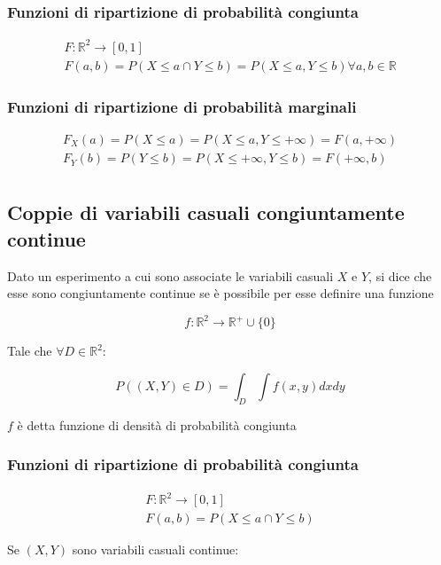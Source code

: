 \documentclass{article}
\begin{document}
\subsubsection{Funzioni di ripartizione di probabilità congiunta}

$$
\begin{matrix}
F:\mathbb{R}^2 \to [0,1] \\
F(a,b) = P(X \leq a \cap Y \leq b) = P(X \leq a, Y \leq b) \forall a,b \in \mathbb{R}
\end{matrix}
$$

\subsubsection{Funzioni di ripartizione di probabilità marginali}

$$
\begin{matrix}
F_X(a) = P(X \leq a) = P(X \leq a, Y\leq+\infty) = F(a,+\infty) \\
F_Y(b) = P(Y \leq b) = P(X\leq+\infty, Y \leq b) = F(+\infty,b) \\
\end{matrix}
$$

\subsection{Coppie di variabili casuali congiuntamente continue}

Dato un esperimento a cui sono associate le variabili casuali $X$ e $Y$, si dice che esse sono congiuntamente continue se è possibile per esse definire una funzione

$$
f:\mathbb{R}^2 \to \mathbb{R}^+ \cup \{0\}
$$

\noindent
Tale che $\forall D \in \mathbb{R}^2$:

$$
P((X,Y) \in D) = \int_{D}\int f(x,y) dx dy
$$

\noindent
$f$ è detta funzione di densità di probabilità congiunta

\subsubsection{Funzioni di ripartizione di probabilità congiunta}

$$
\begin{matrix}
F:\mathbb{R}^2 \to [0,1] \\
F(a,b) = P(X \leq a \cap Y \leq b)
\end{matrix}
$$

Se $(X,Y)$ sono variabili casuali continue:
\end{document}
